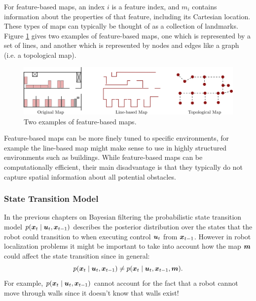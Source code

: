 For feature-based maps, an index $i$ is a feature index, and $m_i$ contains information about the properties of that feature, including its Cartesian location. These types of maps can typically be thought of as a collection of landmarks. Figure \ref{fig:FeatureBasedMaps} gives two examples of feature-based maps, one which is represented by a set of lines, and another which is represented by nodes and edges like a graph (i.e. a topological map).
\begin{figure}[ht]
\centering
\includegraphics[width=0.8\linewidth]{tex/figs/ch17_figs/feature_based_maps.png}
\caption{Two examples of feature-based maps.}
\label{fig:FeatureBasedMaps}
\end{figure}
Feature-based maps can be more finely tuned to specific environments, for example the line-based map might make sense to use in highly structured environments such as buildings. While feature-based maps can be computationally efficient, their main disadvantage is that they typically do not capture spatial information about all potential obstacles.

\subsubsection{State Transition Model}
In the previous chapters on Bayesian filtering the probabilistic state transition model $p(\bm{x}_t \mid \bm{u}_t, \bm{x}_{t-1})$ describes the posterior distribution over the states that the robot could transition to when executing control $\bm{u}_t$ from $\bm{x}_{t-1}$. However in robot localization problems it might be important to take into account how the map $\bm{m}$ could affect the state transition since in general:
\begin{equation*}
p(\bm{x}_t \mid \bm{u}_t, \bm{x}_{t-1}) \neq p(\bm{x}_t \mid \bm{u}_t, \bm{x}_{t-1}, \bm{m}).
\end{equation*}
For example, $p(\bm{x}_t \mid \bm{u}_t, \bm{x}_{t-1})$ cannot account for the fact that a robot cannot move through walls since it doesn't know that walls exist!

